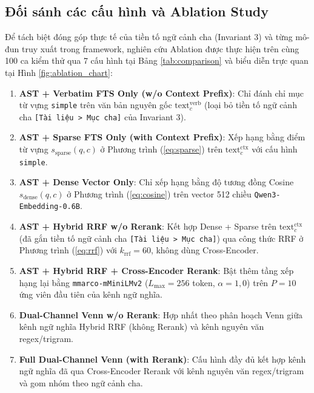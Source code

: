 \subsection{Đối sánh các cấu hình và Ablation Study}
Để tách biệt đóng góp thực tế của tiền tố ngữ cảnh cha (Invariant 3) và từng mô-đun truy xuất trong framework, nghiên cứu Ablation được thực hiện trên cùng 100 ca kiểm thử qua 7 cấu hình tại Bảng \ref{tab:comparison} và biểu diễn trực quan tại Hình \ref{fig:ablation_chart}:
\begin{enumerate}[start=0]
    \item \textbf{AST + Verbatim FTS Only (w/o Context Prefix)}: Chỉ đánh chỉ mục từ vựng \texttt{simple} trên văn bản nguyên gốc $\text{text}^{\text{verb}}_c$ (loại bỏ tiền tố ngữ cảnh cha \texttt{[Tài liệu > Mục cha]} của Invariant 3).
    \item \textbf{AST + Sparse FTS Only (with Context Prefix)}: Xếp hạng bằng điểm từ vựng $s_{\text{sparse}}(q, c)$ ở Phương trình (\ref{eq:sparse}) trên $\text{text}^{\text{ctx}}_c$ với cấu hình \texttt{simple}.
    \item \textbf{AST + Dense Vector Only}: Chỉ xếp hạng bằng độ tương đồng Cosine $s_{\text{dense}}(q, c)$ ở Phương trình (\ref{eq:cosine}) trên vector 512 chiều \texttt{Qwen3-Embedding-0.6B}.
    \item \textbf{AST + Hybrid RRF w/o Rerank}: Kết hợp Dense + Sparse trên $\text{text}^{\text{ctx}}_c$ (đã gắn tiền tố ngữ cảnh cha \texttt{[Tài liệu > Mục cha]}) qua công thức RRF ở Phương trình (\ref{eq:rrf}) với $k_{\text{rrf}}=60$, không dùng Cross-Encoder.
    \item \textbf{AST + Hybrid RRF + Cross-Encoder Rerank}: Bật thêm tầng xếp hạng lại bằng \texttt{mmarco-mMiniLMv2} ($L_{\max} = 256$ token, $\alpha = 1,0$) trên $P = 10$ ứng viên đầu tiên của kênh ngữ nghĩa.
    \item \textbf{Dual-Channel Venn w/o Rerank}: Hợp nhất theo phân hoạch Venn giữa kênh ngữ nghĩa Hybrid RRF (không Rerank) và kênh nguyên văn regex/trigram.
    \item \textbf{Full Dual-Channel Venn (with Rerank)}: Cấu hình đầy đủ kết hợp kênh ngữ nghĩa đã qua Cross-Encoder Rerank với kênh nguyên văn regex/trigram và gom nhóm theo ngữ cảnh cha.
\end{enumerate}


